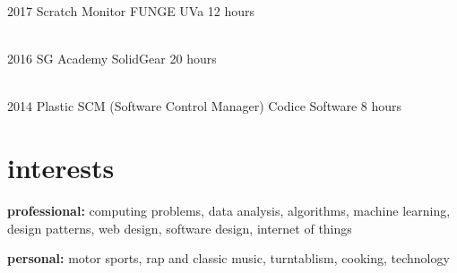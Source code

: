 \documentclass[]{friggeri-cv} %
\begin{document}
        \begin{entrylist}

            \entry
            {2017}
            {Scratch Monitor}
            {FUNGE UVa}
            {12 hours}

            \\
            \entry
            {2016}
            {SG Academy}
            {SolidGear}
            {20 hours}

            \\
            \entry
            {2014}
            {Plastic SCM (Software Control Manager)}
            {Codice Software}
            {8 hours}
        \end{entrylist}





    \section{interests}

        \textbf{professional:} computing problems, data analysis, algorithms, machine learning, design patterns, web design, software design, internet of things

        \textbf{personal:} motor sports, rap and classic music, turntablism, cooking, technology

\end{document}
